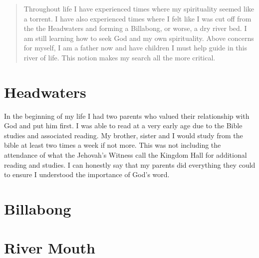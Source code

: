 \documentclass[11pt,a4paper]{scrartcl} %
\begin{document}
    \begin{abstract}
Throughout life I have experienced times where my spirituality seemed like a torrent. I have also experienced times where I felt like I was cut off from the the Headwaters and forming a Billabong, or worse, a dry river bed. I am still learning how to seek God and my own spirituality. Above concerns for myself, I am a father now and have children I must help guide in this river of life. This notion makes my search all the more critical.
    \end{abstract}
       
    \tableofcontents
    
    \section{Headwaters}
\begin{doublespace}
In the beginning of my life I had two parents who valued their relationship with God and put him first. I was able to read at a very early age due to the Bible studies and associated reading. My brother, sister and I would study from the bible at least two times a week if not more. This was not including the attendance of what the Jehovah's Witness call the Kingdom Hall for additional reading and studies. I can honestly say that my parents did everything they could to ensure I understood the importance of God's word. 
\end{doublespace}
   \section{Billabong}
    \section{River Mouth}
\clearpage
    \nocite{*}
    
    
\end{document}
